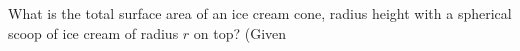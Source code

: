 What is the total surface area of an ice cream cone, radius  height  with a spherical scoop of ice cream of radius $r$ on top? (Given 